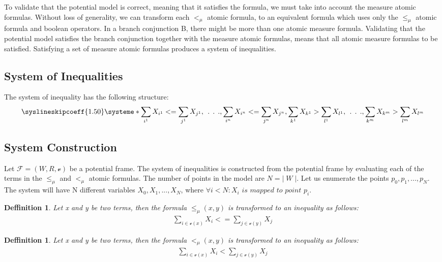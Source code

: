\documentclass{article}
\newtheorem{defn}[theorem]{Deffinition}
\newcommand{\vE}{\mathscr{v}}
\begin{document}
	\leavevmode\newline
	To validate that the potential model is correct, meaning that it satisfies the formula, we must take into account the measure atomic formulas.
	Without loss of generality, we can transform each $<_\mu$ atomic formula, to an equivalent formula which uses only the $\le_\mu$ atomic formula and boolean operators.
	In a branch conjunction B, there might be more than one atomic measure formula. Validating that the potential model satisfies the branch conjunction together with the 
	measure atomic formulas, means that all atomic measure formulas to be satisfied. Satisfying a set of measure atomic formulas produces a system of inequalities.

	\subsection{System of Inequalities} 
		The system of inequality has the following structure:
		\[
			\syslineskipcoeff{1.50}
			\systeme*{\sum_{i^1} X_{i^1} <= \sum_{j^1} X_{j^1},
				\:\:.\:\:.\:\:.,
				\sum_{i^n} X_{i^n} <= \sum_{j^n} X_{j^n}, 
				\sum_{k^1} X_{k^1} > \sum_{l^1} X_{l^1},
				\:\:.\:\:.\:\:.,
				\sum_{k^m} X_{k^m} > \sum_{l^m} X_{l^m}
				}
		\]

		\leavevmode\newline
		\subsection{System Construction}
		Let $\mathscr{F} = (W, R, \vE)$ be a potential frame. The system of inequalities is constructed from the potential frame by evaluating each
		of the terms in the $\le_\mu$ and $<_\mu$ atomic formulas. The number of points in the model are $N = | \; W \; |$. Let us enumerate the points
		$p_0, p_1, ..., p_N$. The system will have N different variables $X_0, X_1, ..., X_N$, 
		where $\forall i < N: X_i \textit{ is mapped to point }p_i$.

		\begin{defn}
			Let x and y be two terms, then the formula $\le_\mu(x, y)$ is transformed to an inequality as follows:
			\begin{align*}
				\sum_{i \in \vE(x)} X_i <= \sum_{j \in \vE(y)} X_j
			\end{align*}
		\end{defn}

		\begin{defn}
			Let x and y be two terms, then the formula $<_\mu(x, y)$ is transformed to an inequality as follows:
			\begin{align*}
				\sum_{i \in \vE(x)} X_i < \sum_{j \in \vE(y)} X_j
			\end{align*}
		\end{defn}
\end{document}
